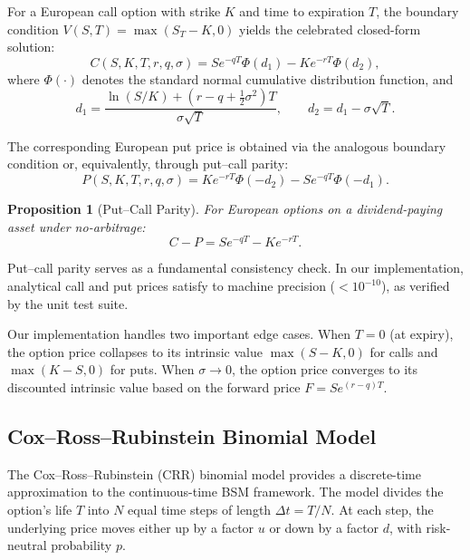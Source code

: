 \documentclass[11pt,a4paper]{article}
\newtheorem{proposition}{Proposition}
\begin{document}
For a European call option with strike $K$ and time to expiration $T$, the boundary condition $V(S, T) = \max(S_T - K, 0)$ yields the celebrated closed-form solution:
\begin{equation}\label{eq:bs_call}
    C(S, K, T, r, q, \sigma) = S e^{-qT} \Phi(d_1) - K e^{-rT} \Phi(d_2),
\end{equation}
where $\Phi(\cdot)$ denotes the standard normal cumulative distribution function, and
\begin{equation}\label{eq:d1d2}
    d_1 = \frac{\ln(S/K) + (r - q + \tfrac{1}{2}\sigma^2) T}{\sigma \sqrt{T}}, \qquad
    d_2 = d_1 - \sigma \sqrt{T}.
\end{equation}

The corresponding European put price is obtained via the analogous boundary condition or, equivalently, through put--call parity:
\begin{equation}\label{eq:bs_put}
    P(S, K, T, r, q, \sigma) = K e^{-rT} \Phi(-d_2) - S e^{-qT} \Phi(-d_1).
\end{equation}

\begin{proposition}[Put--Call Parity]
For European options on a dividend-paying asset under no-arbitrage:
\begin{equation}\label{eq:put_call_parity}
    C - P = S e^{-qT} - K e^{-rT}.
\end{equation}
\end{proposition}

\noindent Put--call parity serves as a fundamental consistency check. In our implementation, analytical call and put prices satisfy  to machine precision ($<10^{-10}$), as verified by the unit test suite.

Our implementation handles two important edge cases. When $T = 0$ (at expiry), the option price collapses to its intrinsic value $\max(S - K, 0)$ for calls and $\max(K - S, 0)$ for puts. When $\sigma \to 0$, the option price converges to its discounted intrinsic value based on the forward price $F = S e^{(r-q)T}$.


\subsection{Cox--Ross--Rubinstein Binomial Model}\label{subsec:binomial}

The Cox--Ross--Rubinstein (CRR) binomial model \citep{cox1979option} provides a discrete-time approximation to the continuous-time BSM framework. The model divides the option's life $T$ into $N$ equal time steps of length $\Delta t = T / N$. At each step, the underlying price moves either up by a factor $u$ or down by a factor $d$, with risk-neutral probability $p$.
\end{document}
